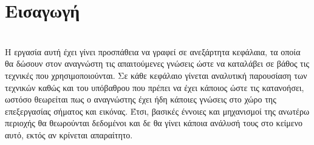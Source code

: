 
\chapter{Εισαγωγή}\label{ch:chap1}
\\
\setlength{\parindent}{24pt} Η εργασία αυτή έχει γίνει προσπάθεια να γραφεί σε ανεξάρτητα κεφάλαια, τα οποία θα δώσουν στον αναγνώστη τις απαιτούμενες γνώσεις ώστε να καταλάβει σε βάθος τις τεχνικές που χρησιμοποιούνται. Σε κάθε κεφάλαιο γίνεται αναλυτική παρουσίαση των τεχνικών καθώς και του υπόβαθρου που πρέπει να έχει κάποιος ώστε τις κατανοήσει, ωστόσο θεωρείται πως ο αναγνώστης έχει ήδη κάποιες γνώσεις στο χώρο της επεξεργασίας σήματος και εικόνας. Έτσι, βασικές έννοιες και μηχανισμοί της ανωτέρω περιοχής θα θεωρούνται δεδομένοι και δε θα γίνει κάποια ανάλυσή τους στο κείμενο αυτό, εκτός αν κρίνεται απαραίτητο.
